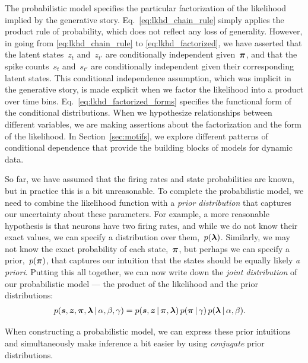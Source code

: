 The probabilistic model specifies the particular factorization of the
likelihood implied by the generative story.
Eq.~\ref{eq:lkhd_chain_rule} simply applies the product rule of
probability, which does not reflect any loss of generality. However,
in going from \eqref{eq:lkhd_chain_rule} to
\eqref{eq:lkhd_factorized}, we have asserted that the latent
states~$z_t$ and~$z_{t'}$ are conditionally independent given~$\boldsymbol{\pi}$,
and that the spike counts~$s_{t}$ and~$s_{t'}$ are conditionally
independent given their corresponding latent states. This conditional
independence assumption, which was implicit in the generative story,
is made explicit when we factor the likelihood into a product over
time bins.  Eq.~\ref{eq:lkhd_factorized_forms} specifies the
functional form of the conditional distributions.  When we hypothesize
relationships between different variables, we are making assertions
about the factorization and the form of the likelihood.  In
Section~\ref{sec:motifs}, we explore different patterns of conditional
dependence that provide the building blocks of models for dynamic
data.

So far, we have assumed that the firing rates and state probabilities are known, but in practice 
this is a bit unreasonable. To complete the probabilistic model, we need 
to combine the likelihood function with a \emph{prior distribution} that 
captures our uncertainty about these parameters. 
For example, a more reasonable hypothesis is that neurons have 
two firing rates, and while we do not know their exact values, we can 
specify a distribution over them,~$p(\boldsymbol{\lambda})$. Similarly, we may not know 
the exact probability of each state,~$\boldsymbol{\pi}$, but perhaps we can specify 
a prior,~$p(\boldsymbol{\pi})$, that captures our intuition that the states should
be equally likely \emph{a priori}.
Putting this all together, we can now write down the \emph{joint
  distribution} of our probabilistic model --- the
product of the likelihood and the prior distributions:
\begin{align}
  \label{eq:full_joint}
  p(\boldsymbol{s}, \boldsymbol{z}, \boldsymbol{\pi}, \boldsymbol{\lambda} \,|\, \alpha, \beta, \gamma) 
  &= p(\boldsymbol{s}, \boldsymbol{z} \,|\, \boldsymbol{\pi}, \boldsymbol{\lambda}) \,
  p(\boldsymbol{\pi} \,|\, \gamma) \, 
     p(\boldsymbol{\lambda} \,|\, \alpha, \beta).
\end{align}

When constructing a probabilistic model, we can express these prior
intuitions and simultaneously make inference a bit easier by using
\emph{conjugate} prior distributions.


